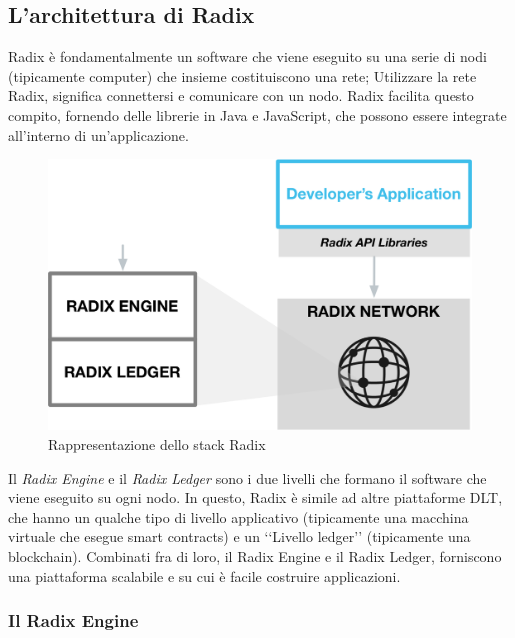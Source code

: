 \subsection{L'architettura di Radix}

Radix è fondamentalmente un software che viene eseguito su una serie di nodi (tipicamente computer) che insieme costituiscono una rete; Utilizzare la rete Radix, significa connettersi e comunicare con un nodo. Radix facilita questo compito, fornendo delle librerie in Java e JavaScript, che possono essere integrate all'interno di un'applicazione.

\begin{figure}[H]
    \includegraphics[width=\linewidth]{images/radix-stack.png}
    \caption{Rappresentazione dello stack Radix}
    \label{fig:radix_stack}
\end{figure}

Il \textit{Radix Engine} e il \textit{Radix Ledger} sono i due livelli che formano il software che viene eseguito su ogni nodo. In questo, Radix è simile ad altre piattaforme DLT, che hanno un qualche tipo di livello applicativo (tipicamente una macchina virtuale che esegue smart contracts) e un ‘‘Livello ledger’’ (tipicamente una blockchain). Combinati fra di loro, il Radix Engine e il Radix Ledger, forniscono una piattaforma scalabile e su cui è facile costruire applicazioni.

\subsubsection{Il Radix Engine}

